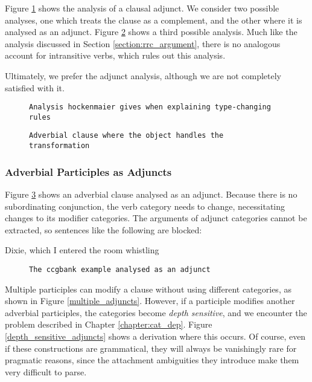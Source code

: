 Figure \ref{ccgbank_clause_adjunct} shows the \ccgbank analysis of a clausal adjunct. We consider two possible analyses, one which treats the clause as a complement, and the other where it is analysed as an adjunct. Figure \ref{internal_argument_adverbial_clause} shows a third possible analysis. Much like the analysis discussed in Section \ref{section:rrc_argument}, there is no analogous account for intransitive verbs, which rules out this analysis.

Ultimately, we prefer the adjunct analysis, although we are not completely satisfied with it.

\begin{figure}
 \begin{verbatim}
Analysis hockenmaier gives when explaining type-changing rules
 \end{verbatim}
\label{ccgbank_clause_adjunct}
\end{figure}

\begin{figure}
 \begin{verbatim}
Adverbial clause where the object handles the transformation
 \end{verbatim}
\label{internal_argument_adverbial_clause}
\end{figure}


\subsubsection{Adverbial Participles as Adjuncts}

Figure \ref{adverbial_adjunct} shows an adverbial clause analysed as an adjunct. Because there is no subordinating conjunction, the verb category needs to change, necessitating changes to its modifier categories. The arguments of adjunct categories cannot be extracted, so sentences like the following are blocked:

\begin{lexamples}
 \item Dixie, which I entered the room whistling
\end{lexamples}

\begin{figure}
 \begin{verbatim}
The ccgbank example analysed as an adjunct
 \end{verbatim}
\label{adverbial_adjunct}
\end{figure}

Multiple participles can modify a clause without using different categories, as shown in Figure \ref{multiple_adjuncts}. However, if a participle modifies another adverbial participles, the categories become \emph{depth sensitive}, and we encounter the problem described in Chapter \ref{chapter:cat_dep}. Figure \ref{depth_sensitive_adjuncts} shows a derivation where this occurs. Of course, even if these constructions are grammatical, they will always be vanishingly rare for pragmatic reasons, since the attachment ambiguities they introduce make them very difficult to parse.

